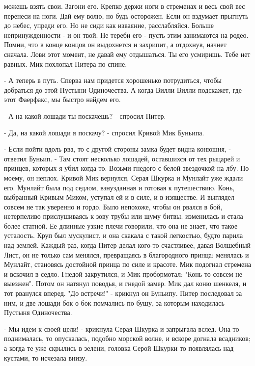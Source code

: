 можешь взять свои. Загони его. Крепко держи ноги в стременах и весь 
свой вес перенеси на ноги. Дай ему волю, но будь осторожен. Если он 
вздумает прыгнуть до небес, упреди его. Но не сиди как изваяние, 
расслабляйся. Больше непринужденности - и он твой. Не тереби его - 
пусть этим занимаются на родео. Помни, что в конце концов он 
выдохнется и захрипит, а отдохнув, начнет сначала. Лови этот момент, 
не давай ему отдышаться. Ты его усмиришь. Тебе нет равных.
 Мик похлопал Питера по спине.
\par- А теперь в путь. Сперва нам придется хорошенько потрудиться, 
чтобы добраться до этой Пустыни Одиночества. А когда Вилли-Вилли 
подскажет, где этот Фаерфакс, мы быстро найдем его.
\par- А на какой лошади ты поскачешь? - спросил Питер.
\par- Да, на какой лошади я поскачу? - спросил Кривой Мик Буньипа.
\par- Если пойти вдоль рва, то с другой стороны замка будет видна 
конюшня, - ответил Буньип. - Там стоят несколько лошадей, оставшихся 
от тех рыцарей и принцев, которых я убил когда-то. Возьми гнедого с 
белой звездочкой на лбу. По-моему, он неплох.
 Кривой Мик вернулся, Серая Шкурка и Мунлайт уже ждали его. 
Мунлайт была под седлом, взнузданная и готовая к путешествию. Конь, 
выбранный Кривым Миком, уступал ей и в силе, и в изяществе. И выглядел 
совсем не так уверенно и гордо. Было непохоже, чтобы он рвался в бой, 
нетерпеливо прислушиваясь к зову трубы или шуму битвы.
 изменилась и стала более статной. Ее длинные узкие плечи 
говорили, что она не знает, что такое усталость. Круп был мускулист, и 
она скакала с такой легкостью, будто парила над землей. Каждый раз, 
когда Питер делал кого-то счастливее, давая Волшебный Лист, он не 
только сам менялся, превращаясь в благородного принца: менялась и 
Мунлайт, становясь достойной принца по силе и красоте.
 Мик подогнал стремена и вскочил в седло. Гнедой закрутился, 
и Мик пробормотал: "Конь-то совсем не выезжен". Потом он натянул 
поводья, и гнедой замер.
 Мик дал коню шенкеля, и тот рванулся вперед. "До встречи!" 
- крикнул он Буньипу. Питер последовал за ним, и две лошади бок о бок 
помчались по бушу, за которым находилась Пустыня Одиночества.
\par- Мы идем к своей цели! - крикнула Серая Шкурка и запрыгала вслед. 
Она то поднималась, то опускалась, подобно морской волне, и вскоре 
догнала всадников; а когда те уже скрылись в зелени, головка Серой 
Шкурки то появлялась над кустами, то исчезала внизу.
